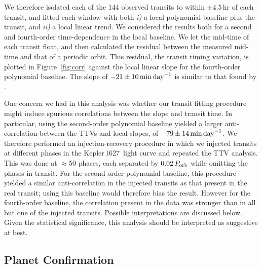 \documentclass[12pt,modern,twocolumn,tighten,linenumbers,trackchanges]{aastex63}
\newcommand{\sn}{Kepler\,1627} %
\begin{document}
We therefore isolated each of the 144 observed transits to within
$\pm4.5$\,hr of each transit, and fitted each window with both {\it
i)} a local polynomial baseline plus the transit, and {\it ii)} a local linear
trend.  We considered the results both for a second and fourth-order
time-dependence in the local baseline.  We let the mid-time of each
transit float, and then calculated the residual between the measured
mid-time and that of a periodic orbit.  This residual, the transit
timing variation, is plotted in Figure~\ref{fig:corr} against
the local linear slope for the fourth-order polynomial baseline.  The
slope of $-21 \pm 10\,{\rm min\,day}^{-1}$ is similar to that
found by \citet{holczer_time_2015}.

One concern we had in this analysis was whether our transit fitting
procedure might induce spurious correlations between the slope and
transit time.  In particular, using the second-order polynomial
baseline yielded a larger anti-correlation between the TTVs and local
slopes, of $-79 \pm 14\,{\rm min\,day}^{-1}$.  We therefore
performed an injection-recovery procedure in which we injected
transits at different phases in the \sn\ light curve and repeated the
TTV analysis.  This was done at $\approx$50 phases, each separated by
$0.02\,P_{\rm orb}$ while omitting the phases in transit.  For
the second-order polynomial baseline, this procedure yielded
a similar anti-correlation in the injected transits as that present in the real
transit;
using this baseline would therefore bias the
result.  However for the fourth-order baseline, the correlation
present in the data was stronger than in all but one of the injected
transits.
Possible interpretations are discussed below. Given the
statistical significance, this analysis should be interpreted as
suggestive at best.


\subsection{Planet Confirmation}
\end{document}
